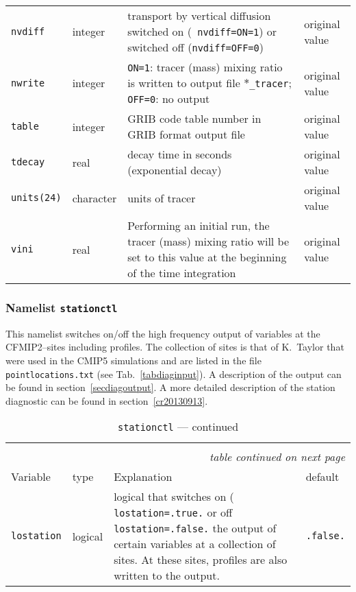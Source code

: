 \begin{longtable}{l@{\extracolsep\fill}lp{7cm}p{3.5cm}}
{\tt nvdiff}\index{namelist variables!nvdiff}
 & integer & transport by vertical diffusion switched on ({\tt
  nvdiff=ON=1}) or switched off ({\tt nvdiff=OFF=0}) & original value\\
{\tt nwrite}\index{namelist variables!nwrite}
 & integer & {\tt ON=1}: tracer (mass) mixing ratio is
written to output file {\tt $\ast$\_tracer}; {\tt OFF=0}: no output &
original value\\
{\tt table}\index{namelist variables!table}
 & integer & GRIB code table number in GRIB format output
file & original value \\
{\tt tdecay}\index{namelist variables!tdecay}
 & real & decay time in seconds (exponential decay) &
original value\\
{\tt units(24)}\index{namelist variables!units}
 & character & units of tracer  & original value \\
{\tt vini}\index{namelist variables!vini}
 & real & Performing an initial run, the tracer (mass) mixing
ratio will be set to this value at the beginning of the time
integration & original value \\
\hline
\end{longtable}

\subsubsection{Namelist {\tt stationctl}}

This namelist switches on/off the high frequency output of \echam{}
variables at the CFMIP2--sites including profiles. The collection of sites
is that of K.~Taylor that were used in the CMIP5 simulations and are
listed in the file {\tt pointlocations.txt} (see
Tab.~\ref{tabdiaginput}). A description of the output can be found in
section~\ref{secdiagoutput}. A more detailed description of the
station diagnostic can be found in section~\ref{cr20130913}.

\setlength{\LTcapwidth}{\textwidth}
\setlength{\LTleft}{0pt}\setlength{\LTright}{0pt}

\begin{longtable}{l@{\extracolsep\fill}lp{5.0cm}p{3.0cm}}\hline\hline
\caption[Namelist {\tt stationctl}]{Namelist
  {\tt stationctl}}\\\hline\label{tabstationctl}
\endfirsthead
\caption[]{{\tt stationctl} --- continued}\\\hline
\endhead
\hline\multicolumn{4}{r}{\slshape table continued on next page}\\
\endfoot
\hline %
\endlastfoot
Variable & type & Explanation & default \\\hline
{\tt lostation}\index{namelist variables!lostation} & logical & logical that switches on ({\tt
  lostation=.true.} or off {\tt lostation=.false.} the output
of certain \echam{} variables at a collection of sites. At these
sites, profiles are also written to the output. & {\tt .false.}\\
\hline
\end{longtable}

